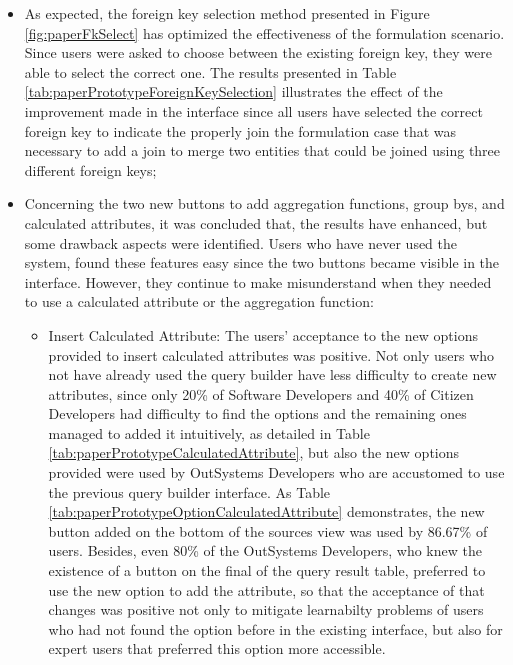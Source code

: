 \begin{itemize}
  \item As expected, the foreign key selection method presented in Figure \ref{fig:paperFkSelect} has optimized the effectiveness of the formulation scenario. Since users were asked to choose between the existing foreign key, they were able to select the correct one. The results presented in Table \ref{tab:paperPrototypeForeignKeySelection} illustrates the effect of the improvement made in the interface since all users have selected the correct foreign key to indicate the properly join the formulation case that was necessary to add a join to merge two entities that could be joined using three different foreign keys;
  \item Concerning the two new buttons to add aggregation functions, group bys, and calculated attributes, it was concluded that, the results have enhanced, but some drawback aspects were identified. Users who have never used the system, found these features easy since the two buttons became visible in the interface. However, they continue to make misunderstand when they needed to use a calculated attribute or the aggregation function:
  \begin{itemize}
    \item Insert Calculated Attribute: The users' acceptance to the new options provided to insert calculated attributes was positive. Not only users who not have already used the query builder have less difficulty to create new attributes, since only 20\% of Software Developers and 40\% of Citizen Developers had difficulty to find the options and the remaining ones managed to added it intuitively, as detailed in Table \ref{tab:paperPrototypeCalculatedAttribute}, but also the new options provided were used by OutSystems Developers who are accustomed to use the previous query builder interface. As Table \ref{tab:paperPrototypeOptionCalculatedAttribute} demonstrates, the new button added on the bottom of the sources view was used by 86.67\% of users. Besides, even 80\% of the OutSystems Developers, who knew the existence of a button on the final of the query result table, preferred to use the new option to add the attribute, so that the acceptance of that changes was positive not only to mitigate learnabilty problems of users who had not found the option before in the existing interface, but also for expert users that preferred this option more accessible.
  \end{itemize}
\end{itemize}

